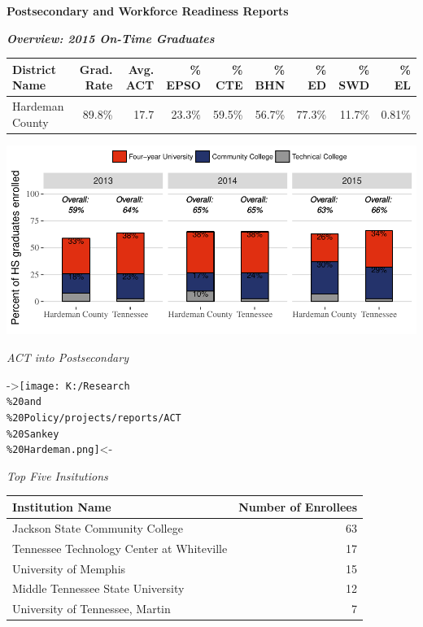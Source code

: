 \documentclass[11pt,]{article}
\title{}
\author{}
\date{}
\begin{document}
\begin{center}
\textbf{Postsecondary and Workforce Readiness Reports}
\textbf{}
  
\textbf{\textit{Overview: 2015 On-Time Graduates}}
\end{center}

\begin{longtable}[]{@{}lrrrrrrrr@{}}
\toprule
District Name & Grad. Rate & Avg. ACT & \% EPSO & \% CTE & \% BHN & \%
ED & \% SWD & \% EL\tabularnewline
\midrule
\endhead
Hardeman County & 89.8\% & 17.7 & 23.3\% & 59.5\% & 56.7\% & 77.3\% &
11.7\% & 0.81\%\tabularnewline
\bottomrule
\end{longtable}

\begin{center}\includegraphics{20170517_PSWRR_files/figure-latex/`District by Type P1`-1} \end{center}\begin{center}
\textit{ACT into Postsecondary}
\end{center}

-\textgreater{}\texttt{[image: K:/Research\\\%20and\\\%20Policy/projects/reports/ACT\\\%20Sankey\\\%20Hardeman.png]}\textless{}-

\begin{center}
\textit{Top Five Insitutions}
\end{center}

\begin{longtable}[]{@{}lr@{}}
\toprule
Institution Name & Number of Enrollees\tabularnewline
\midrule
\endhead
Jackson State Community College & 63\tabularnewline
Tennessee Technology Center at Whiteville & 17\tabularnewline
University of Memphis & 15\tabularnewline
Middle Tennessee State University & 12\tabularnewline
University of Tennessee, Martin & 7\tabularnewline
\bottomrule
\end{longtable}
\end{document}
